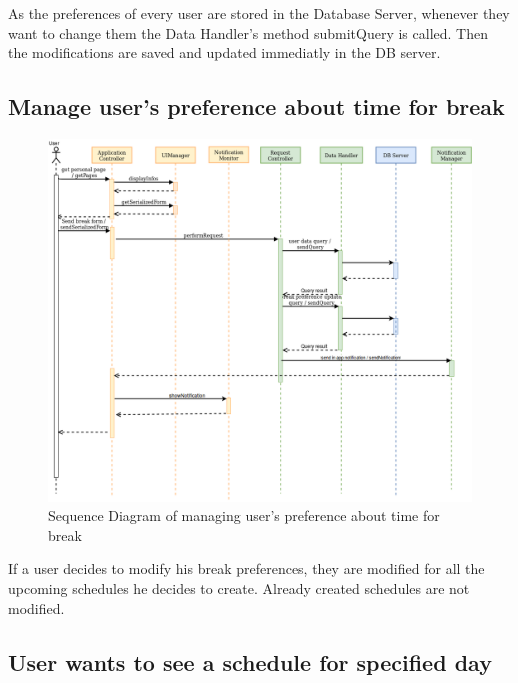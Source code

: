 \documentclass[numbers=noenddot, 12pt, a4paper, oneside]{scrbook}
\begin{document}
As the preferences of every user are stored in the Database Server, whenever they want to change them the Data Handler's method submitQuery is called. Then the modifications are saved and updated immediatly in the DB server.

\subsection*{Manage user's preference about time for break}

\begin{figure}[H]
	\centering
	\includegraphics[width=1.1\textwidth,angle=-0]{images/Goal8}
	\caption{Sequence Diagram of managing user's preference about time for break}
\end{figure}

If a user decides to modify his break preferences, they are modified for all the upcoming schedules he decides to create. Already created schedules are not modified.


\subsection*{User wants to see a schedule for specified day}
\end{document}
